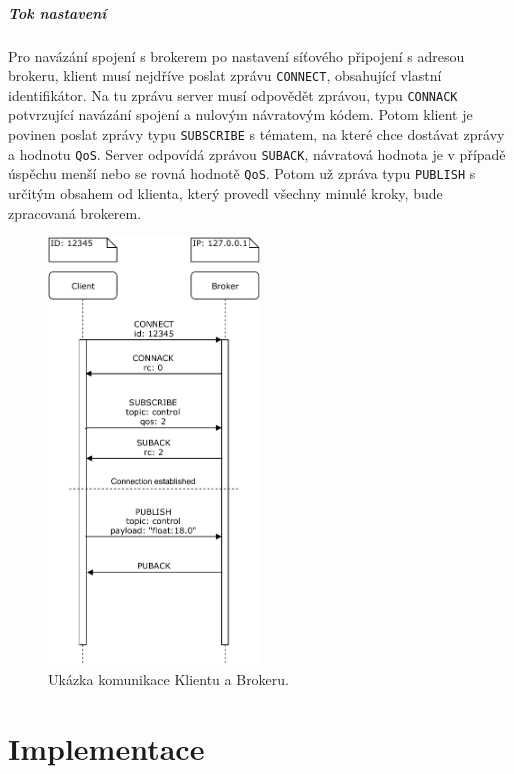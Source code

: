 \paragraph{Tok nastavení}

Pro navázání spojení s brokerem po nastavení síťového připojení s adresou brokeru, klient musí nejdříve poslat zprávu \texttt{CONNECT}, obsahující vlastní identifikátor. Na tu zprávu server musí odpovědět zprávou,  typu \texttt{CONNACK} potvrzující navázání spojení a nulovým návratovým kódem. Potom klient je povinen poslat zprávy typu \texttt{SUBSCRIBE} s tématem, na které chce dostávat zprávy a hodnotu \texttt{QoS}. Server odpovídá zprávou \texttt{SUBACK}, návratová hodnota je v případě úspěchu menší nebo se rovná  hodnotě \texttt{QoS}. Potom už zpráva typu \texttt{PUBLISH} s určitým obsahem od klienta, který provedl všechny minulé kroky, bude zpracovaná brokerem.

\begin{figure}[hbt]
 \centering
 \includegraphics[width=0.5\textwidth]{obrazky-figures/MQTT-flow.pdf}
 \caption{Ukázka komunikace Klientu a Brokeru.}
 \label{mqtt-flow}
\end{figure}

\chapter{Implementace}
\label{chap:implementation}


